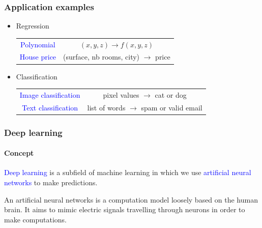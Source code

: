 \documentclass[10pt]{beamer}
\begin{document}
\begin{frame}

  \frametitle{Application examples}

  \begin{itemize}
    \item Regression

      \begin{center}
        \begin{tabular}{cc}
          \textcolor{blue}{Polynomial} & $(x, y, z) \to f(x, y, z)$ \\[0.5cm]
          \textcolor{blue}{House price} & (surface, nb rooms, city) $\to$ price \\[0.5cm]
        \end{tabular}
      \end{center}

    \item Classification

      \begin{center}
        \begin{tabular}{cc}
          \textcolor{blue}{Image classification} & pixel values $\to$ cat or dog \\[0.5cm]
          \textcolor{blue}{Text classification} & list of words $\to$ spam or valid email
        \end{tabular}
      \end{center}
  \end{itemize}

\end{frame}

\begin{frame}

  \frametitle{Deep learning}

  \framesubtitle{Concept}

  \textcolor{blue}{Deep learning} is a subfield of machine learning in
  which we use \textcolor{blue}{artificial neural networks} to make
  predictions.

  \bigskip

  An artificial neural networks is a computation model loosely based
  on the human brain. It aims to mimic electric signals travelling
  through neurons in order to make computations.

\end{frame}
\end{document}
